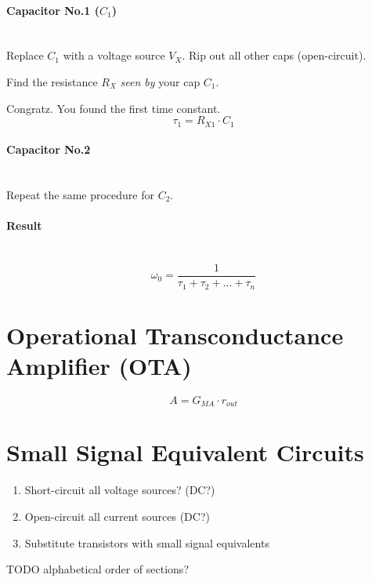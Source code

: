 \documentclass[twocolumn]{article}
\begin{document}
    \paragraph{Capacitor No.1 ($C_1$)} \hfill \\
      Replace $C_1$ with a voltage source $V_X$.
      Rip out all other caps (open-circuit).
  
      Find the resistance $R_X$ \emph{seen by} your cap $C_1$.
  
      Congratz. You found the first time constant.
      $$\tau_1 = R_{X1} \cdot C_1$$

    \paragraph{Capacitor No.2} \hfill \\
      Repeat the same procedure for $C_2$.

    \paragraph{Result} \hfill \\
      $$\omega_0 = \frac{1}{\tau_1 + \tau_2 + ... + \tau_n}$$

  \section{Operational Transconductance Amplifier (OTA)}
    $$A = G_{MA} \cdot r_{out}$$

  \section{Small Signal Equivalent Circuits}
    \begin{enumerate}
      \item Short-circuit all voltage sources? (DC?)
      \item Open-circuit all current sources (DC?)
      \item Substitute transistors with small signal equivalents
    \end{enumerate}

  TODO alphabetical order of sections?
\end{document}
